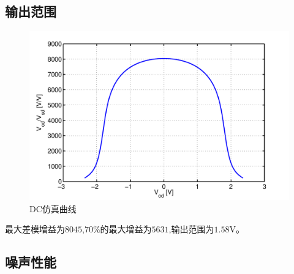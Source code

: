 \documentclass[a4paper]{article}
\newcommand{\uV}{\si{\volt}}
\begin{document}
\subsection{输出范围}
\begin{figure}[htb]
    \begin{center}
        \includegraphics[width=\textwidth]{common/dc.pdf}
    \end{center}
    \caption{DC仿真曲线}
    \label{commondc}
\end{figure}
最大差模增益为$8045$,$70\%$的最大增益为$5631$,输出范围为$1.58\uV$。
\newpage
\subsection{噪声性能}
\end{document}
